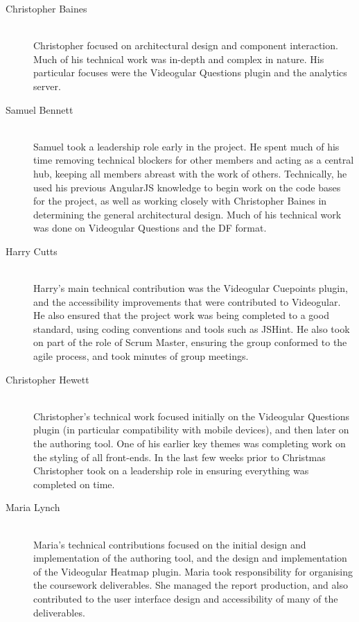 \begin{description}
	\item[Christopher Baines] \hfill \\
		Christopher focused on architectural design and component interaction. Much of his technical work was in-depth and complex in nature. His particular focuses were the Videogular Questions plugin and the analytics server.
	\item[Samuel Bennett] \hfill \\
		Samuel took a leadership role early in the project. He spent much of his time removing technical blockers for other members and acting as a central hub, keeping all members abreast with the work of others. Technically, he used his previous \gls{AngularJS} knowledge to begin work on the code bases for the project, as well as working closely with Christopher Baines in determining the general architectural design. Much of his technical work was done on Videogular Questions and the \gls{DF} format.
	\item[Harry Cutts] \hfill \\
		Harry's main technical contribution was the Videogular Cuepoints plugin, and the accessibility improvements that were contributed to \gls{Videogular}. He also ensured that the project work was being completed to a good standard, using coding conventions and tools such as JSHint. He also took on part of the role of Scrum Master, ensuring the group conformed to the agile process, and took minutes of group meetings.
	\item[Christopher Hewett] \hfill \\
		Christopher's technical work focused initially on the Videogular Questions plugin (in particular compatibility with mobile devices), and then later on the authoring tool. One of his earlier key themes was completing work on the styling of all front-ends. In the last few weeks prior to Christmas Christopher took on a leadership role in ensuring everything was completed on time.
	\item[Maria Lynch] \hfill \\
		Maria's technical contributions focused on the initial design and implementation of the authoring tool, and the design and implementation of the Videogular Heatmap plugin. Maria took responsibility for organising the coursework deliverables. She managed the report production, and also contributed to the user interface design and accessibility of many of the deliverables.
\end{description}

